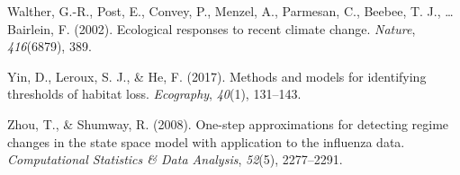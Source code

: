 \documentclass[12pt,twoside,openany]{reedthesis}
\begin{document}
\hypertarget{ref-walther_ecological_2002}{}
Walther, G.-R., Post, E., Convey, P., Menzel, A., Parmesan, C., Beebee,
T. J., \ldots{} Bairlein, F. (2002). Ecological responses to recent
climate change. \emph{Nature}, \emph{416}(6879), 389.

\hypertarget{ref-yin2017methods}{}
Yin, D., Leroux, S. J., \& He, F. (2017). Methods and models for
identifying thresholds of habitat loss. \emph{Ecography}, \emph{40}(1),
131--143.

\hypertarget{ref-zhou2008one}{}
Zhou, T., \& Shumway, R. (2008). One-step approximations for detecting
regime changes in the state space model with application to the
influenza data. \emph{Computational Statistics \& Data Analysis},
\emph{52}(5), 2277--2291.
\end{document}

